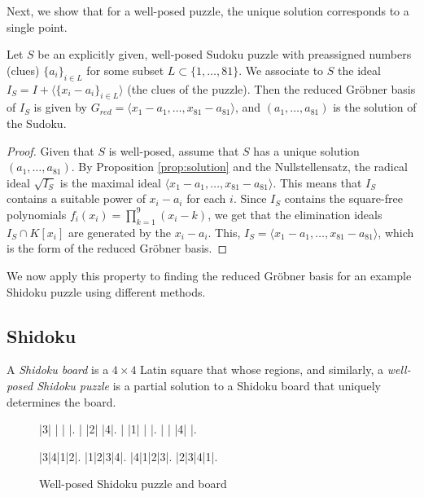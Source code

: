 \documentclass[../main.tex]{subfiles}
\begin{document}
        Next, we show that for a well-posed puzzle, the unique solution corresponds to a single point. 
        \begin{proposition} \label{prop:unique}
            Let $S$ be an explicitly given, well-posed Sudoku puzzle with preassigned numbers (clues) $\{a_i\}_{i\in L}$ for some subset $L\subset \{1,\dots,81\}$. We associate to $S$ the ideal $I_S=I+\langle\{x_i-a_i\}_{i\in L}\rangle$ (the clues of the puzzle). Then the reduced Gr\"obner basis of $I_S$ is given by $G_{red}=\langle x_1-a_1,\dots,x_{81}-a_{81}\rangle$, and $(a_1,\dots,a_{81})$ is the solution of the Sudoku.
        \end{proposition}
        \begin{proof}
            Given that $S$ is well-posed, assume that $S$ has a unique solution $(a_1,\dots,a_{81})$. By Proposition \ref{prop:solution} and the Nullstellensatz, the radical ideal $\sqrt{I_S}$ is the maximal ideal $\langle x_1-a_1,\dots,x_{81}-a_{81}\rangle$. This means that $I_S$ contains a suitable power of $x_i-a_i$ for each $i$. Since $I_S$ contains the square-free polynomials $f_i(x_i)=\prod^9_{k=1}(x_i-k)$, we get that the elimination ideals $I_S\cap K[x_i]$ are generated by the $x_i-a_i$. This, $I_S=\langle x_1-a_1,\dots,x_{81}-a_{81}\rangle$, which is the form of the reduced Gr\"obner basis.
        \end{proof}

        We now apply this property to finding the reduced Gr\"obner basis for an example Shidoku puzzle using different methods.

    \subsection{Shidoku}

            A \emph{Shidoku board} is a $4\times 4$ Latin square that whose regions, and similarly, a \emph{well-posed Shidoku puzzle} is a partial solution to a Shidoku board that uniquely determines the board.

            \begin{figure}[h!]
                
                \centering
                \begin{shidoku-block}
                    |3| | | |.
                    | |2| |4|.
                    | |1| | |.
                    | | |4| |.
                \end{shidoku-block}
                \hspace*{10pt}
                \begin{shidoku-block}
                    |3|4|1|2|.
                    |1|2|3|4|.
                    |4|1|2|3|.
                    |2|3|4|1|.
                \end{shidoku-block}
                \caption{Well-posed Shidoku puzzle and board}
                \label{fig:shidoku}
            \end{figure}
\end{document}
